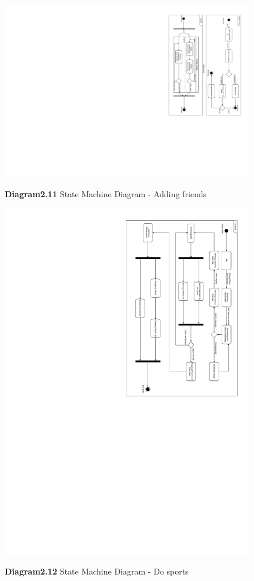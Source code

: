 \documentclass[a4paper]{article}
\begin{document}
	\begin{figure}[H]
		\centering
		\caption*{\textbf{Diagram2.11} State Machine Diagram - Adding friends}
		\includegraphics[width = 0.98\textwidth]{images/StateMachineDiagram_AddFriends_final.pdf}
		\label{SMD_AddFriend}
	\end{figure}

	\begin{figure}[H]
		\centering
		\caption*{\textbf{Diagram2.12} State Machine Diagram - Do sports}
		\includegraphics[width = 0.98\textwidth]{images/StateMachineDiagram_DoSport.pdf}
		\label{SMD_DoSport}
	\end{figure}
\end{document}
